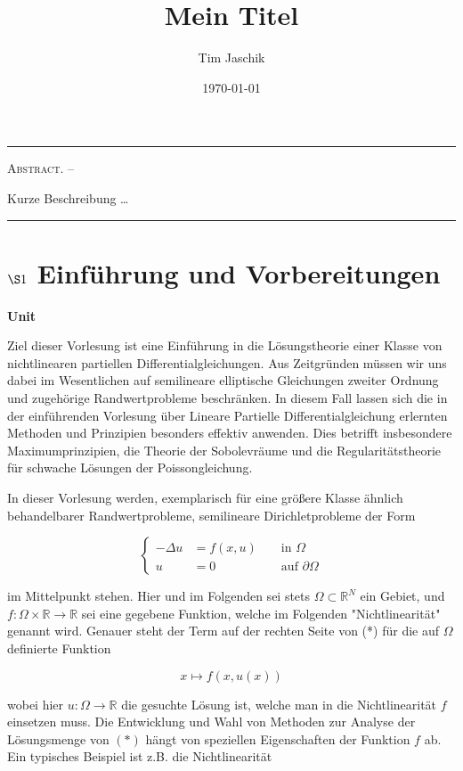 \documentclass[10pt, letterpaper]{article}
\title{Mein Titel}
\author{Tim Jaschik}
\date{\today}
\renewenvironment{abstract}
  {
    \begin{adjustwidth}{1.5cm}{1.5cm}
    \small
    \textsc{Abstract. –}%
  }
  {
    \end{adjustwidth}
  }
\newenvironment{unit}[1]
  {\begin{unitbox}\textbf{Unit #1}\par\smallskip}
  {\end{unitbox}}
\begin{document}
\maketitle
\rule{\textwidth}{0.5pt}
\begin{abstract}
Kurze Beschreibung …
\end{abstract}
\rule{\textwidth}{0.5pt}
\vspace{0.5cm}

\tableofcontents

\pagebreak

\section*{$\S 1$ Einführung und Vorbereitungen}



    \begin{unit}{}
      Ziel dieser Vorlesung ist eine Einführung in die Lösungstheorie einer Klasse von nichtlinearen partiellen Differentialgleichungen. Aus Zeitgründen müssen wir uns dabei im Wesentlichen auf semilineare elliptische Gleichungen zweiter Ordnung und zugehörige Randwertprobleme beschränken. In diesem Fall lassen sich die in der einführenden Vorlesung über Lineare Partielle Differentialgleichung erlernten Methoden und Prinzipien besonders effektiv anwenden. Dies betrifft insbesondere Maximumprinzipien, die Theorie der Sobolevräume und die Regularitätstheorie für schwache Lösungen der Poissongleichung.
    \end{unit}

    
    
In dieser Vorlesung werden, exemplarisch für eine größere Klasse ähnlich behandelbarer Randwertprobleme, semilineare Dirichletprobleme der Form

$$
\left\{\begin{aligned}
-\Delta u & =f(x, u) & & \text { in } \Omega \\
u & =0 & & \text { auf } \partial \Omega
\end{aligned}\right.
$$

im Mittelpunkt stehen. Hier und im Folgenden sei stets $\Omega \subset \mathbb{R}^{N}$ ein Gebiet, und $f: \Omega \times \mathbb{R} \rightarrow \mathbb{R}$ sei eine gegebene Funktion, welche im Folgenden "Nichtlinearität" genannt wird. Genauer steht der Term auf der rechten Seite von (*) für die auf $\Omega$ definierte Funktion

$$
x \mapsto f(x, u(x))
$$

wobei hier $u: \Omega \rightarrow \mathbb{R}$ die gesuchte Lösung ist, welche man in die Nichtlinearität $f$ einsetzen muss. Die Entwicklung und Wahl von Methoden zur Analyse der Lösungsmenge von $(*)$ hängt von speziellen Eigenschaften der Funktion $f$ ab. Ein typisches Beispiel ist z.B. die Nichtlinearität
\end{document}
